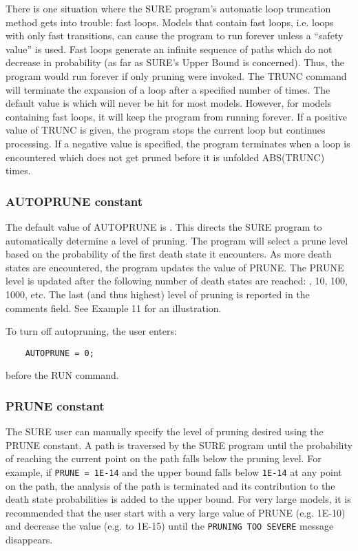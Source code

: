 There is one situation where the SURE program's automatic loop truncation
method gets into trouble: fast loops.  Models that contain fast
loops, i.e. loops with only fast transitions, can cause the program to run
forever unless a ``safety value'' is used.  Fast loops generate an infinite
sequence of paths which do not decrease in probability (as far as SURE's Upper
Bound is concerned).  Thus, the program would run forever if only pruning were
invoked.  The {\isf TRUNC} command will terminate the expansion of a loop
after a specified number of times.  The default value is {} which will
never be hit for most models.  However, for models containing fast loops, it
will keep the program from running forever.  If a positive value of {\isf
TRUNC} is given, the program stops the current loop but continues processing.
If a negative value is specified, the program terminates when a loop is
encountered which does not get pruned before it is unfolded {\isf ABS(TRUNC)}
times.

\subsubsection{AUTOPRUNE constant}
 
The default value of {\isf AUTOPRUNE} is {}.  This directs the SURE
program to automatically determine a level of pruning.  The program will
select a prune level based on the probability of the first death state it
encounters.  As more death states are encountered, the program updates the
value of {\isf PRUNE}.  The {\isf PRUNE} level is updated after the following
number of death states are reached: {, 10, 100, 1000}, etc.  The last
(and thus highest) level of pruning is reported in the comments field.
See Example 11 for an illustration.

To turn off autopruning, the user enters:
\begin{verbatim} 
    AUTOPRUNE = 0;
\end{verbatim} 
before the {\isf RUN} command.  

\subsubsection{PRUNE constant}
The SURE user can manually specify the level of pruning desired using the
{\isf PRUNE} constant.  A path is traversed by the SURE program until the
probability of reaching the current point on the path falls below the pruning
level.  For example, if \verb|PRUNE = 1E-14| and the upper bound falls below
\verb|1E-14| at any point on the path, the analysis of the path is terminated
and its contribution to the death state probabilities is added to the upper
bound.  For very large models, it is recommended that the user start with a
very large value of {\isf PRUNE} (e.g. {\isf 1E-10}) and decrease the value
(e.g. to {\isf 1E-15}) until the \verb|PRUNING TOO SEVERE| message disappears.

